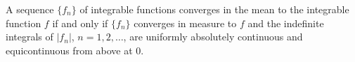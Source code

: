 A sequence $\{f_n\}$ of integrable functions converges in the mean to the integrable function $f$ if and only if $\{f_n\}$ converges in measure to $f$ and the indefinite integrals of $|f_n|$, $n = 1, 2, \dots$, are uniformly absolutely continuous and equicontinuous from above at $0$.
